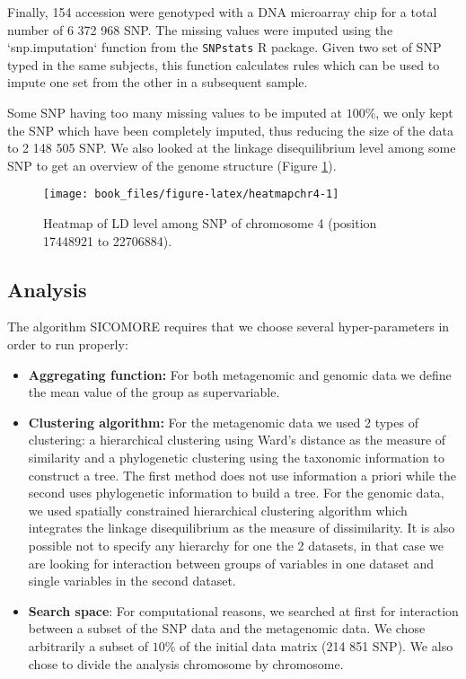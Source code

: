 \documentclass[]{book}
\begin{document}
Finally, 154 accession were genotyped with a DNA microarray chip for a
total number of 6 372 968 SNP. The missing values were imputed using the
`snp.imputation` function from the \texttt{SNPstats} R package. Given two set
of SNP typed in the same subjects, this function calculates rules which
can be used to impute one set from the other in a subsequent sample.

Some SNP having too many missing values to be imputed at \(100\%\), we
only kept the SNP which have been completely imputed, thus reducing the
size of the data to 2 148 505 SNP. We also looked at the linkage
disequilibrium level among some SNP to get an overview of the genome
structure (Figure \ref{fig:heatmapchr4}).



\begin{figure}

{\centering \texttt{[image: book\_files/figure-latex/heatmapchr4-1]} 

}

\caption{Heatmap of LD level among SNP of chromosome 4 (position 17448921 to 22706884).}\label{fig:heatmapchr4}
\end{figure}

\hypertarget{analysis}{%
\subsection{Analysis}\label{analysis}}

The algorithm SICOMORE requires that we choose several hyper-parameters
in order to run properly:

\begin{itemize}
\item
  \textbf{Aggregating function:} For both metagenomic and genomic data we
  define the mean value of the group as supervariable.
\item
  \textbf{Clustering algorithm:} For the metagenomic data we used 2 types
  of clustering: a hierarchical clustering using Ward's distance as
  the measure of similarity and a phylogenetic clustering using the
  taxonomic information to construct a tree. The first method does not
  use information a priori while the second uses phylogenetic
  information to build a tree. For the genomic data, we used spatially
  constrained hierarchical clustering algorithm which integrates the
  linkage disequilibrium as the measure of dissimilarity. It is also
  possible not to specify any hierarchy for one the 2 datasets, in
  that case we are looking for interaction between groups of variables
  in one dataset and single variables in the second dataset.
\item
  \textbf{Search space}: For computational reasons, we searched at first
  for interaction between a subset of the SNP data and the metagenomic
  data. We chose arbitrarily a subset of \(10\%\) of the initial data
  matrix (214 851 SNP). We also chose to divide the analysis
  chromosome by chromosome.
\end{itemize}
\end{document}
